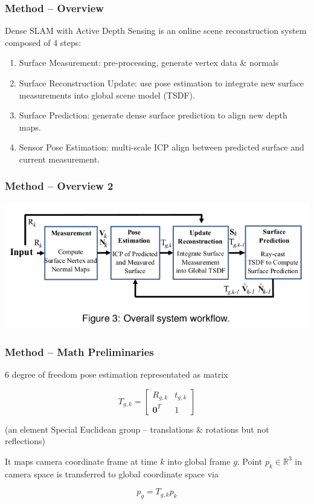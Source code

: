 \begin{frame}
\frametitle{Method -- Overview}

Dense SLAM with Active Depth Sensing is an online scene reconstruction system
composed of 4 steps:

\begin{enumerate}
  \item Surface Measurement: pre-processing, generate vertex data \& normals
  \item Surface Reconstruction Update: use pose estimation to integrate new surface measurements into
  global scene model (TSDF).
  \item Surface Prediction: generate dense surface prediction to align new depth maps.
  \item Sensor Pose Estimation: multi-scale ICP align between predicted surface and current measurement.
\end{enumerate}
\end{frame}

\begin{frame}
\frametitle{Method -- Overview 2}

\includegraphics[scale=0.45]{img/method_diagram.png}
\end{frame}


\begin{frame}
\frametitle{Method -- Math Preliminaries}
6 degree of freedom pose estimation representated as matrix

\[ T_{g,k} = \begin{bmatrix} R_{g,k} & t_{g,k} \\ \mathbf{0}^T & 1 \end{bmatrix} \]

(an element Special Euclidean group -- translations \& rotations but not reflections)

It maps camera coordinate frame at time $k$ into global frame $g$.
Point $p_k \in \mathbb{R}^3$ in camera space is transferred
to global coordinate space via

\[ p_g = T_{g,k} p_k \]


\end{frame}


